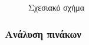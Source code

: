 \documentclass{assignment}
\begin{document}
\begin{landscape}
\begin{figure}
\begin{center}
\caption{Σχεσιακό σχήμα}
\label{fig:RelationalModel:diagram}
\end{center}
\end{figure}
\end{landscape}



\subsubsection{Ανάλυση πινάκων}
\end{document}
